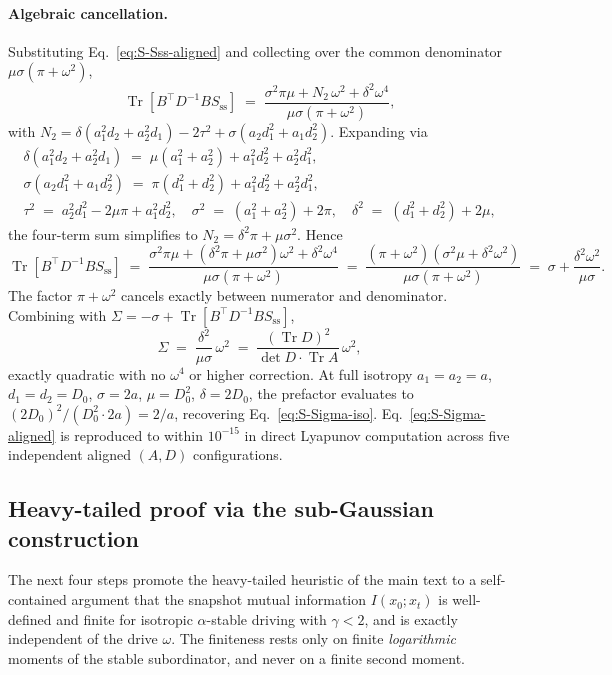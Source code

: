 \documentclass[%
 reprint,
 superscriptaddress,
 nofootinbib,
 nobibnotes,
 amsmath,amssymb,
 aps,
 prl,
 floatfix,
]{revtex4-2}
\newcommand{\Sss}{S_{\mathrm{ss}}}
\newcommand{\Tr}{\operatorname{Tr}}
\begin{document}
\paragraph{Algebraic cancellation.}
Substituting Eq.~\eqref{eq:S-Sss-aligned} and collecting over the common denominator $\mu \sigma (\pi + \omega^2)$,
\[
\Tr[B^\top D^{-1} B \Sss] \;=\; \frac{\sigma^2 \pi \mu + N_2\,\omega^2 + \delta^2 \omega^4}{\mu \sigma (\pi + \omega^2)},
\]
with $N_2 = \delta(a_1^2 d_2 + a_2^2 d_1) - 2\tau^2 + \sigma(a_2 d_1^2 + a_1 d_2^2)$. Expanding via
\begin{gather*}
\delta(a_1^2 d_2 + a_2^2 d_1) \;=\; \mu(a_1^2 + a_2^2) + a_1^2 d_2^2 + a_2^2 d_1^2, \\
\sigma(a_2 d_1^2 + a_1 d_2^2) \;=\; \pi(d_1^2 + d_2^2) + a_1^2 d_2^2 + a_2^2 d_1^2, \\
\tau^2 \;=\; a_2^2 d_1^2 - 2\mu\pi + a_1^2 d_2^2, \quad
\sigma^2 \;=\; (a_1^2 + a_2^2) + 2\pi, \quad
\delta^2 \;=\; (d_1^2 + d_2^2) + 2\mu,
\end{gather*}
the four-term sum simplifies to $N_2 = \delta^2 \pi + \mu \sigma^2$. Hence
\[
\Tr[B^\top D^{-1} B \Sss] \;=\; \frac{\sigma^2 \pi \mu + (\delta^2 \pi + \mu \sigma^2)\omega^2 + \delta^2 \omega^4}{\mu \sigma (\pi + \omega^2)} \;=\; \frac{(\pi + \omega^2)(\sigma^2 \mu + \delta^2 \omega^2)}{\mu \sigma (\pi + \omega^2)} \;=\; \sigma + \frac{\delta^2 \omega^2}{\mu \sigma}.
\]
The factor $\pi + \omega^2$ cancels exactly between numerator and denominator. Combining with $\Sigma = -\sigma + \Tr[B^\top D^{-1} B \Sss]$,
\begin{equation}\label{eq:S-Sigma-aligned}
\Sigma \;=\; \frac{\delta^2}{\mu \sigma}\,\omega^2 \;=\; \frac{(\Tr D)^2}{\det D \cdot \Tr A}\,\omega^2,
\end{equation}
exactly quadratic with no $\omega^4$ or higher correction. At full isotropy $a_1 = a_2 = a$, $d_1 = d_2 = D_0$, $\sigma = 2a$, $\mu = D_0^2$, $\delta = 2 D_0$, the prefactor evaluates to $(2 D_0)^2/(D_0^2 \cdot 2a) = 2/a$, recovering Eq.~\eqref{eq:S-Sigma-iso}. Eq.~\eqref{eq:S-Sigma-aligned} is reproduced to within $10^{-15}$ in direct Lyapunov computation across five independent aligned $(A, D)$ configurations.

\subsection{Heavy-tailed proof via the sub-Gaussian construction}\label{app:heavy-tailed}

The next four steps promote the heavy-tailed heuristic of the main text to a self-contained argument that the snapshot mutual information $I(x_0; x_t)$ is well-defined and finite for isotropic $\alpha$-stable driving with $\gamma < 2$, and is exactly independent of the drive $\omega$. The finiteness rests only on finite \emph{logarithmic} moments of the stable subordinator, and never on a finite second moment.
\end{document}
